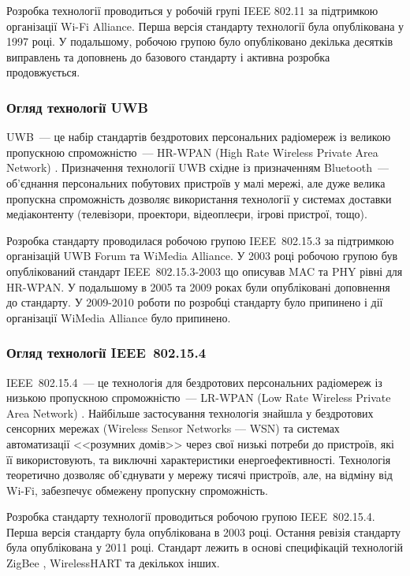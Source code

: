 \documentclass[a4paper,ukrainian,utf8,nocolumnsxix,floatsection,equationsection]{eskdtext}
\renewcommand\paragraph{\subsubsection}
\newcommand{\iee}[0]{IEEE~802.15.4\xspace}
\newcommand{\engtxt}[1]{\foreignlanguage{english}{#1}}
\begin{document}
Розробка технології проводиться у робочій групі IEEE 802.11 за підтримкою організації Wi-Fi Alliance. Перша версія стандарту технології була опублікована у 1997 році. У подальшому, робочою групою було опубліковано декілька десятків виправлень та доповнень до базового стандарту і активна розробка продовжується.

\paragraph{Огляд технології UWB} %
\label{par:uwb}

UWB~--- це набір стандартів бездротових персональних радіомереж із великою пропускною спроможністю~--- HR-WPAN (High Rate Wireless Private Area Network) \cite{comparative:wireless:protocols}. Призначення технології UWB східне із призначенням Bluetooth~--- об'єднання  персональних побутових пристроїв у малі мережі, але дуже велика пропускна спроможність дозволяє використання технології у системах доставки медіаконтенту (телевізори, проектори, відеоплеєри, ігрові пристрої, тощо).

Розробка стандарту проводилася робочою групою IEEE~802.15.3 за підтримкою організацій UWB Forum та WiMedia Alliance. У 2003 році робочою групою був опублікований стандарт IEEE~802.15.3-2003 що описував MAC та PHY рівні для HR-WPAN. У подальшому в 2005 та 2009 роках були опубліковані доповнення до стандарту. У 2009-2010 роботи по розробці стандарту було припинено і дії організації WiMedia Alliance було припинено.

\paragraph{Огляд технології \iee}
\label{par:iee}

\iee~--- це технологія для бездротових персональних радіомереж із низькою пропускною спроможністю~--- LR-WPAN (\engtxt{Low Rate Wireless Private Area Network}) \cite{comparative:wireless:protocols}. Найбільше застосування технологія знайшла у бездротових сенсорних мережах (Wireless Sensor Networks --- WSN) та системах автоматизації <<розумних домів>> через свої низькі потреби до пристроїв, які її використовують, та виключні характеристики енергоефективності. Технологія теоретично дозволяє об'єднувати у мережу тисячі пристроїв, але, на відміну від Wi-Fi, забезпечує обмежену пропускну спроможність. 

Розробка стандарту технології проводиться робочою групою \iee. Перша версія стандарту була опублікована в 2003 році. Остання ревізія стандарту була опублікована у 2011 році. Стандарт лежить в основі специфікацій технологій ZigBee \cite{zigbee:core:spec}, WirelessHART \cite{wihart:zigbee:comparison} та декількох інших.
\end{document}
